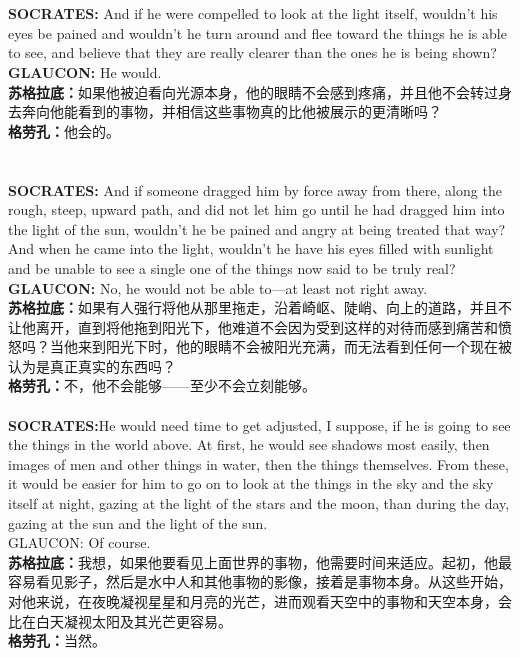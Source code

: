 \documentclass{article}
\begin{document}
\\\\
\textbf{SOCRATES: }And if he were compelled to look at the light itself, wouldn't his eyes be pained and wouldn't he turn around and flee toward the things he is able to see, and believe that they are really clearer than the ones he is being shown? \\
\textbf{GLAUCON}\textbf{: }He would.\\
\textbf{苏格拉底：}如果他被迫看向光源本身，他的眼睛不会感到疼痛，并且他不会转过身去奔向他能看到的事物，并相信这些事物真的比他被展示的更清晰吗？ \\
\textbf{格劳孔：}他会的。\\
\\\\
\textbf{SOCRATES:} And if someone dragged him by force away from there, along the rough, steep, upward path, and did not let him go until he had dragged him into the light of the sun, wouldn't he be pained and angry at being treated that way? And when he came into the light, wouldn't he have his eyes filled with sunlight and be unable to see a single one of the things now said to be truly real?\\
\textbf{GLAUCON: }No, he would not be able to—at least not right away.\\
\textbf{苏格拉底：}如果有人强行将他从那里拖走，沿着崎岖、陡峭、向上的道路，并且不让他离开，直到将他拖到阳光下，他难道不会因为受到这样的对待而感到痛苦和愤怒吗？当他来到阳光下时，他的眼睛不会被阳光充满，而无法看到任何一个现在被认为是真正真实的东西吗？\\
\textbf{格劳孔：}不，他不会能够——至少不会立刻能够。\\

\\
\textbf{SOCRATES:}He would need time to get adjusted, I suppose, if he is going to see the things in the world above. At first, he would see shadows most easily, then images of men and other things in water, then the things themselves. From these, it would be easier for him to go on to look at the things in the sky and the sky itself at night, gazing at the light of the stars and the moon, than during the day, gazing at the sun and the light of the sun.\\
GLAUCON: Of course.\\
\textbf{苏格拉底：}我想，如果他要看见上面世界的事物，他需要时间来适应。起初，他最容易看见影子，然后是水中人和其他事物的影像，接着是事物本身。从这些开始，对他来说，在夜晚凝视星星和月亮的光芒，进而观看天空中的事物和天空本身，会比在白天凝视太阳及其光芒更容易。\\
\textbf{格劳孔：}当然。\\
\end{document}
